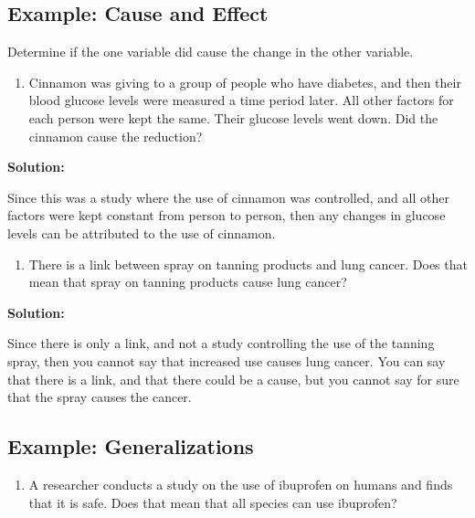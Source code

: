 \documentclass[
]{book}
\providecommand{\tightlist}{%
  \setlength{\itemsep}{0pt}\setlength{\parskip}{0pt}}
\begin{document}
\hypertarget{example-cause-and-effect}{%
\subsection{Example: Cause and Effect}\label{example-cause-and-effect}}

Determine if the one variable did cause the change in the other variable.

\begin{enumerate}
\def\labelenumi{\alph{enumi}.}
\tightlist
\item
  Cinnamon was giving to a group of people who have diabetes, and then their blood glucose levels were measured a time period later. All other factors for each person were kept the same. Their glucose levels went down. Did the cinnamon cause the reduction?
\end{enumerate}

\textbf{Solution:}

Since this was a study where the use of cinnamon was controlled, and all other factors were kept constant from person to person, then any changes in glucose levels can be attributed to the use of cinnamon.

\begin{enumerate}
\def\labelenumi{\alph{enumi}.}
\setcounter{enumi}{1}
\tightlist
\item
  There is a link between spray on tanning products and lung cancer. Does that mean that spray on tanning products cause lung cancer?
\end{enumerate}

\textbf{Solution:}

Since there is only a link, and not a study controlling the use of the tanning spray, then you cannot say that increased use causes lung cancer. You can say that there is a link, and that there could be a cause, but you cannot say for sure that the spray causes the cancer.

\hypertarget{example-generalizations}{%
\subsection{Example: Generalizations}\label{example-generalizations}}

\begin{enumerate}
\def\labelenumi{\alph{enumi}.}
\tightlist
\item
  A researcher conducts a study on the use of ibuprofen on humans and finds that it is safe. Does that mean that all species can use ibuprofen?
\end{enumerate}
\end{document}
